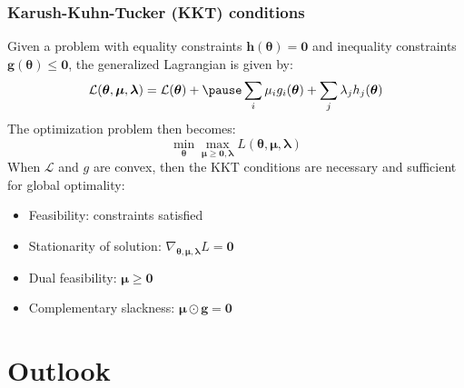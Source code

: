 \documentclass[smaller]{beamer}
\newcommand{\?}{\stackrel{?}{=}}
\newcommand{\bl}{\color{blue}}
\newcommand{\gr}{\color{green!40!black}}
\newcommand{\la}{\lambda}
\renewcommand{\th}{\theta}
\newcommand{\mc}{\mathcal}
\newcommand{\pe}{\pause}
\begin{document}
\begin{frame}
  \frametitle{Karush-Kuhn-Tucker (KKT) conditions}
  \pe
  Given a problem with equality constraints $\bm h(\bm\th) = \bm 0$ and inequality constraints $\bm g(\bm\th) \le \bm 0$, the generalized Lagrangian is given by:\pe
  \begin{equation}
    \mc L(\bm\th,\bm\mu,\bm\la) = \mc{L}(\bm\th) +\pe \sum_i\mu_ig_i(\bm\th) + \sum_j\la_jh_j(\bm\th)
  \end{equation}\pe
  The optimization problem then becomes:
  \pe
  \begin{equation}
    \min_{\bm\th} \max_{\bm\mu\ge\bm 0,\bm\la}L(\bm\th,\bm\mu,\bm\la)
  \end{equation}
  \pe
  When $\mc{L}$ and $g$ are convex, then the KKT conditions are necessary and sufficient for global optimality: \pe
  \begin{itemize}
  \item Feasibility: constraints satisfied \pe
  \item Stationarity of solution: $\nabla_{\bm\th,\bm\mu,\bm\la}L = \bm0$\pe
  \item Dual feasibility: $\bm\mu \ge \bm0$\pe
  \item Complementary slackness: $\bm\mu \odot \bm g= \bm0$
  \end{itemize}
\end{frame}
\section{Outlook}





\end{document}
